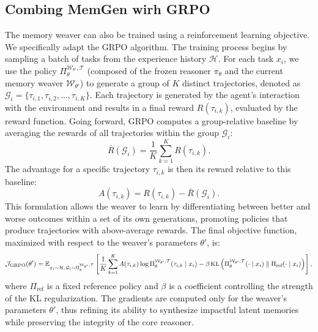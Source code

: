 \documentclass[]{fairmeta}
\newcommand{\ourmethod}{{\fontfamily{lmtt}\selectfont \textbf{MemGen}}\xspace}
\begin{document}
\subsection{Combing \ourmethod wirh GRPO}
The memory weaver can also be trained using a reinforcement learning objective. We specifically adapt the GRPO algorithm. 
The training process begins by sampling a batch of tasks from the experience history $\mathcal{H}$. For each task $x_i$, we use the policy $\Pi_{\theta}^{\mathcal{W}_{\theta'}, \mathcal{T}}$ (composed of the frozen reasoner $\pi_\theta$ and the current memory weaver $\mathcal{W}_{\theta'}$) to generate a group of $K$ distinct trajectories, denoted as $\mathcal{G}_i = \{\tau_{i,1}, \tau_{i,2}, \ldots, \tau_{i,K}\}$. Each trajectory is generated by the agent's interaction with the environment and results in a final reward $R(\tau_{i,k})$, evaluated by the reward function. Going forward, GRPO computes a group-relative baseline by averaging the rewards of all trajectories within the group $\mathcal{G}_i$:
\begin{equation}
\bar{R}(\mathcal{G}_i) = \frac{1}{K} \sum_{k=1}^{K} R(\tau_{i,k}).
\end{equation}
The advantage for a specific trajectory $\tau_{i,k}$ is then its reward relative to this baseline:
\begin{equation}
A(\tau_{i,k}) = R(\tau_{i,k}) - \bar{R}(\mathcal{G}_i).
\end{equation}
This formulation allows the weaver to learn by differentiating between better and worse outcomes within a set of its own generations, promoting policies that produce trajectories with above-average rewards. The final objective function, maximized with respect to the weaver's parameters $\theta'$, is:
\begin{equation}
\small
\mathcal{J}_{\text{GRPO}}(\theta') = \mathbb{E}_{x_i \sim \mathcal{H}, \, \mathcal{G}_i \sim \Pi_{\theta}^{\mathcal{W}_{\theta'}, \mathcal{T}}} \left[ \frac{1}{K} \sum_{k=1}^{K} A(\tau_{i,k}) \log \Pi_{\theta}^{\mathcal{W}_{\theta'}, \mathcal{T}}(\tau_{i,k} \mid x_i) - \beta \, \text{KL} \left( \Pi_{\theta}^{\mathcal{W}_{\theta'}, \mathcal{T}}(\cdot \mid x_i) \parallel \Pi_{\text{ref}}(\cdot \mid x_i) \right) \right],
\end{equation}
where $\Pi_{\text{ref}}$ is a fixed reference policy and $\beta$ is a coefficient controlling the strength of the KL regularization. The gradients are computed only for the weaver's parameters $\theta'$, thus refining its ability to synthesize impactful latent memories while preserving the integrity of the core reasoner.
\end{document}
